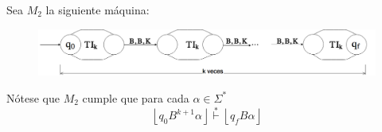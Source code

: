 \begin{frame}
  \begin{block}{}
    \PN Sea $M_{2}$ la siguiente máquina:
  \end{block}
    \begin{figure}[h]
      \centering
      \includegraphics[scale=0.27]{graphics/figure_10.png}
    \end{figure}

  \begin{block}{}
    \PN Nótese que $M_{2}$ cumple que para cada $\alpha \in \Sigma^{\ast}$
    \begin{equation*}
      \left\lfloor q_{0} B^{k+1} \alpha \right\rfloor \overset{\ast}{\vdash} \left\lfloor q_{f} B \alpha \right\rfloor
    \end{equation*}
  \end{block}
\end{frame}
